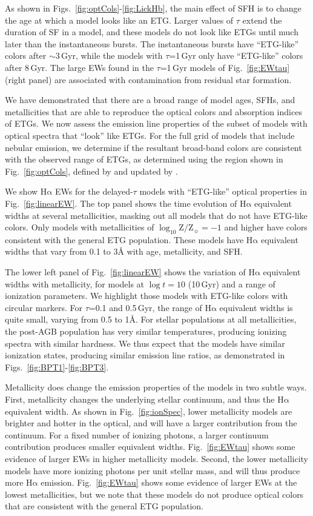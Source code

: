 \documentclass[preprint2]{aastex62}
\newcommand{\ha}{\ensuremath{\mathrm{H\alpha}}\xspace}
\newcommand{\logten}{\ensuremath{\log_{10}}}
\newcommand{\logZeq}[1]{\ensuremath{\logten \mathrm{Z}/\mathrm{Z}_{\sun} = #1}}
\newcommand{\ang}{\ensuremath{\mbox{\AA}}\xspace}
\newcommand{\Gyr}{$\,$Gyr\xspace}
\begin{document}
As shown in Figs.~\ref{fig:optCols}-\ref{fig:LickHb}, the main effect of SFH is to change the age at which a model looks like an ETG. Larger values of $\tau$ extend the duration of SF in a model, and these models do not look like ETGs until much later than the instantaneous bursts. The instantaneous bursts have ``ETG-like'' colors after $\sim3$\Gyr, while the models with $\tau$=1\Gyr only have ``ETG-like'' colors after 8\Gyr. The large EWs found in the $\tau$=1\Gyr models of Fig.~\ref{fig:EWtau} (right panel) are associated with contamination from residual star formation.

We have demonstrated that there are a broad range of model ages, SFHs, and metallicities that are able to reproduce the optical colors and absorption indices of ETGs. We now assess the emission line properties of the subset of models with optical spectra that ``look'' like ETGs. For the full grid of models that include nebular emission, we determine if the resultant broad-band colors are consistent with the observed range of ETGs, as determined using the region shown in Fig.~\ref{fig:optCols}, defined by \citet{Holden+2012} and updated by \citet{McIntosh+2014}.

We show \ha EWs for the delayed-$\tau$ models with ``ETG-like'' optical properties in Fig.~\ref{fig:linearEW}.
The top panel shows the time evolution of \ha equivalent widths at several metallicities, masking out all models that do not have ETG-like colors. Only models with metallicities of \logZeq{-1} and higher have colors consistent with the general ETG population. These models have \ha equivalent widths that vary from 0.1 to 3\ang with age, metallicity, and SFH.

The lower left panel of Fig.~\ref{fig:linearEW} shows the variation of \ha equivalent widths with metallicity, for models at $\log t = 10$ (10\Gyr) and a range of ionization parameters. We highlight those models with ETG-like colors with circular markers. For $\tau$=0.1 and 0.5\Gyr, the range of \ha equivalent widths is quite small, varying from 0.5 to 1\ang. For stellar populations at all metallicities, the post-AGB population has very similar temperatures, producing ionizing spectra with similar hardness. We thus expect that the models have similar ionization states, producing similar emission line ratios, as demonstrated in Figs.~\ref{fig:BPT1}-\ref{fig:BPT3}. 

Metallicity does change the emission properties of the models in two subtle ways. First, metallicity changes the underlying stellar continuum, and thus the \ha equivalent width. As shown in Fig.~\ref{fig:ionSpec}, lower metallicity models are brighter and hotter in the optical, and will have a larger contribution from the continuum. For a fixed number of ionizing photons, a larger continuum contribution produces smaller equivalent widths. Fig.~\ref{fig:EWtau} shows some evidence of larger EWs in higher metallicity models. Second, the lower metallicity models have more ionizing photons per unit stellar mass, and will thus produce more \ha emission. Fig.~\ref{fig:EWtau} shows some evidence of larger EWs at the lowest metallicities, but we note that these models do not produce optical colors that are consistent with the general ETG population.
\end{document}
